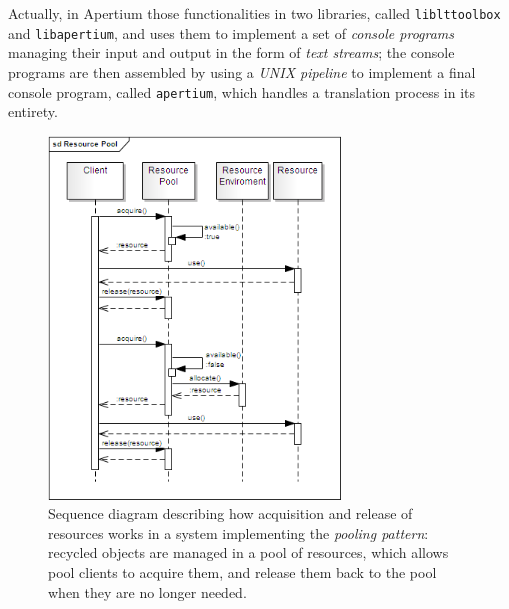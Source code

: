 \documentclass[11pt]{article}
\begin{document}


Actually, in Apertium those functionalities in two libraries, called {\tt\small liblttoolbox} and {\tt\small libapertium}, and uses them to implement a set of \emph{console programs} managing their input and output in the form of \emph{text streams}; the console programs are then assembled by using a \emph{UNIX pipeline} to implement a final console program, called {\tt\small apertium}, which handles a translation process in its entirety.



\begin{figure}[!ht]
\begin{center}
\includegraphics[width=7.75cm]{resource_pool}
\end{center}
\caption{Sequence diagram describing how acquisition and release of resources works in a system implementing the \emph{pooling pattern}: recycled objects are managed in a pool of resources, which allows pool clients to acquire them, and release them back to the pool when they are no longer needed.}
\label{fig:rp}
\end{figure}
\end{document}
